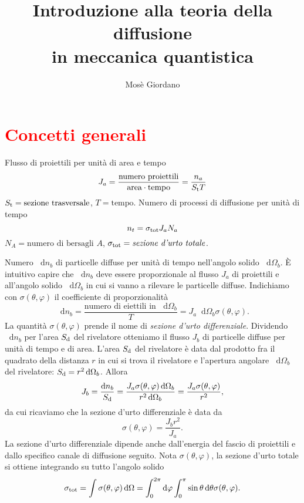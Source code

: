 \documentclass[a4paper,fleqn,twoside,12pt]{article}
\title{Introduzione alla teoria della diffusione \\ in meccanica quantistica}
\author{Mosè Giordano}
\renewcommand{\phi}{\varphi}
\newcommand{\completare}[1]{\textcolor{red}{#1}}
\newcommand*{\dd}{\mathop{}\!\mathrm{d}} %
\begin{document}
\maketitle
\tableofcontents

\section{\completare{Concetti generali}}
\label{sec:concetti-generali}

Flusso di proiettili per unità di area e tempo
\begin{equation}
  J_{a} = \frac{\text{numero proiettili}}{\text{area}\cdot\text{tempo}} =
  \frac{n_{a}}{S_{\textup{t}} T}
\end{equation}
$S_{\textup{t}} = \text{sezione trasversale}$, $T = \text{tempo}$.  Numero di
processi di diffusione per unità di tempo
\begin{equation}
  n_{t} = \sigma_{\textup{tot}} J_{a} N_{a}
\end{equation}
$N_{A} = \text{numero di bersagli $A$}$,
$\sigma_{\textup{tot}} = \text{\emph{sezione d'urto totale}}$.

Numero $\dd n_{b}$ di particelle diffuse per unità di tempo nell'angolo solido
$\dd\Omega_{b}$.  È intuitivo capire che $\dd n_{b}$ deve essere proporzionale
al flusso $J_{a}$ di proiettili e all'angolo solido $\dd\Omega_{b}$ in cui si
vanno a rilevare le particelle diffuse.  Indichiamo con $\sigma(\theta,\phi)$ il
coefficiente di proporzionalità
\begin{equation}
  \dd n_{b} = \frac{\text{numero di eiettili in $\dd\Omega_{b}$}}{T} = J_{a}
  \dd\Omega_{b} \sigma(\theta,\phi).
\end{equation}
La quantità $\sigma(\theta,\phi)$ prende il nome di
\emph{sezione d'urto differenziale}.  Dividendo $\dd n_{b}$ per l'area
$S_{\textup{d}}$ del rivelatore otteniamo il flusso $J_{b}$ di particelle
diffuse per unità di tempo e di area.  L'area $S_{\textup{d}}$ del rivelatore è
data dal prodotto fra il quadrato della distanza $r$ in cui si trova il
rivelatore e l'apertura angolare $\dd\Omega_{b}$ del rivelatore:
$S_{\textup{d}} = r^{2}\dd\Omega_{b}$.  Allora
\begin{equation}
  J_{b} = \frac{\dd n_{b}}{S_{\textup{d}}} = \frac{J_{a} \sigma(\theta,\phi)
    \dd\Omega_{b}}{r^{2} \dd\Omega_{b}} = \frac{J_{a}
    \sigma(\theta,\phi)}{r^{2}},
\end{equation}
da cui ricaviamo che la sezione d'urto differenziale è data da
\begin{equation}
  \label{eq:sezione-d'urto}
  \sigma(\theta,\phi) = \frac{J_{b}r^{2}}{J_{a}}.
\end{equation}
La sezione d'urto differenziale dipende anche dall'energia del fascio di
proiettili e dallo specifico canale di diffusione seguito.  Nota
$\sigma(\theta,\phi)$, la sezione d'urto totale si ottiene integrando su tutto
l'angolo solido
\begin{equation}
  \sigma_{\textup{tot}} = \int \sigma(\theta,\phi) \dd\Omega = \int_{0}^{2\pi}
  \dd \phi \int_{0}^{\pi} \sin \theta \dd\theta \sigma(\theta,\phi).
\end{equation}
\end{document}
